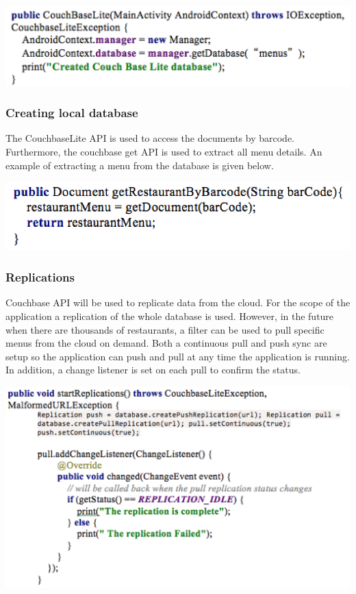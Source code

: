 \documentclass[12pt, titlepage]{article}
\begin{document}
\includegraphics[width=150mm,scale=0.5]{createDatabase.png}

\subsubsection{Creating local database}
The CouchbaseLite API is used to access the documents by barcode. Furthermore, the couchbase get API is used to extract all menu details. An example of extracting a menu from the database is given below.

\includegraphics[width=150mm,scale=0.5]{accessdatabase.png}

\subsubsection{Replications}
Couchbase API will be used to replicate data from the cloud. For the scope of the application a replication of the whole database is used. However, in the future when there are thousands of restaurants, a filter can be used to pull specific menus from the cloud on demand. Both a continuous pull and push sync are setup so the application can push and pull at any time the application is running. In addition, a change listener is set on each pull to confirm the status. 

\includegraphics[width=150mm,scale=0.5]{replications.png}
\end{document}
